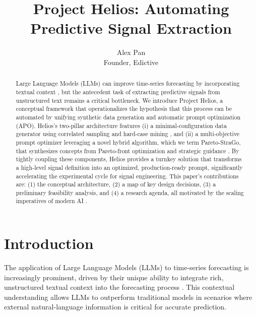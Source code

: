 \documentclass{article}
\title{Project Helios: Automating \\Predictive Signal Extraction}
\author{
  Alex Pan\\
  Founder, Edictive
}
\date{}  %
\begin{document}
\begingroup
\renewcommand\thefootnote{}
\endgroup
\maketitle
\begin{abstract}
  Large Language Models (LLMs) can improve time-series forecasting by incorporating textual context \citep{williams2025contextkeybenchmarkforecasting}, but the antecedent task of extracting predictive signals from unstructured text remains a critical bottleneck. We introduce Project Helios, a conceptual framework that operationalizes the hypothesis that this process can be automated by unifying synthetic data generation and automatic prompt optimization (APO). Helios's two-pillar architecture features (i) a minimal-configuration data generator using correlated sampling \citep{kowshik2024corrsynthcorrelatedsampling} and hard-case mining \citep{wu2024stragoharnessingstrategicguidance}, and (ii) a multi-objective prompt optimizer leveraging a novel hybrid algorithm, which we term Pareto-StraGo, that synthesizes concepts from Pareto-front optimization \citep{zhao2025pareto} and strategic guidance \citep{wu2024stragoharnessingstrategicguidance}. By tightly coupling these components, Helios provides a turnkey solution that transforms a high-level signal definition into an optimized, production-ready prompt, significantly accelerating the experimental cycle for signal engineering. This paper's contributions are: (1) the conceptual architecture, (2) a map of key design decisions, (3) a preliminary feasibility analysis, and (4) a research agenda, all motivated by the scaling imperatives of modern AI \citep{kaplan2020scalinglawsneurallanguage}.

\end{abstract}

\section{Introduction}
\label{sec:introduction}
The application of Large Language Models (LLMs) to time-series forecasting is increasingly prominent, driven by their unique ability to integrate rich, unstructured textual context into the forecasting process \citep{williams2025contextkeybenchmarkforecasting, ansari2024chronoslearninglanguagetime, jin2024timellmtimeseriesforecasting}. This contextual understanding allows LLMs to outperform traditional models in scenarios where external natural-language information is critical for accurate prediction. 
\end{document}
